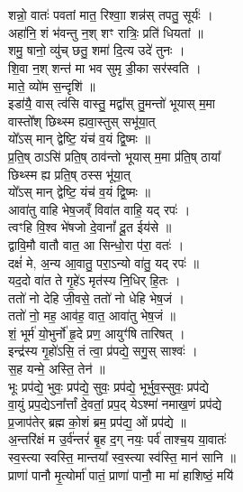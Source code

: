 \section{}
शन्नो॒ वातः॑ पवतां मात॒ रिश्वाा॒ शन्न॑स् तपतु॒ सूर्यः॑ । \\
अहा॑नि॒ शं भ॑वन्तु न॒श् शꣳ रात्रिः॒ प्रति॑ धियतां ॥\\
शमु॒ षानो॒ व्यु॑च् छतु॒ शमा॑ दि॒त्य उदे॑ तुनः । \\
शि॒वा न॒श् शन्त॑ मा भव सुमृ डी॒का सर॑स्वति ।\\
माते॒ व्यो॑म स॒न्दृशि॑ ॥\\
इडा॑यै॒ वास् त्व॑सि वास्तु॒ मद्वा᳚स् तु॒मन्तो॑ भूयास् म॒मा \\
वास्तो᳚श् छिथ्स्म ह्यवा॒स्तुस् सभू॑या॒त्\\
यो᳚ऽस् मान् द्वेष्टि॒ यंच॑ व॒यं द्वि॒ष्मः ॥\\
प्र॒ति॒ष् ठाऽसि॑ प्रति॒ष् ठाव॑न्तो भूयास् म॒मा प्र॑ति॒ष् ठाया᳚\\
छिथ्स्म ह्य प्रति॒ष् ठस्स भू॑या॒त् \\
यो᳚ऽस् मान् द्वेष्टि॒ यंच॑ व॒यं द्वि॒ष्मः ॥\\
आवा॑तु वाहि भेष॒जव्ँ विवा॑त वाहि॒ यद् रपः॑ ।\\
त्वꣳहि वि॒श्व भे॑षजो दे॒वानां᳚ दू॒त ईय॑से ॥\\
द्वावि॒मौ वातौ वात॒ आ सिन्धो॒रा प॑रा॒ वतः॑ । \\
दक्षं॑ मे, अ॒न्य आ॒वातु॒ परा॒ऽन्यो वा॑तु॒ यद् रपः॑ ॥\\
यद॒दो वा॑त ते गृ॒हे॑ऽ मृत॑स्य नि॒धिर् हि॒तः । \\
ततो॑ नो देहि जी॒वसे॒ ततो॑ नो धेहि भेष॒जं ।\\
ततो॑ नो॒ मह॒ आव॑ह॒ वात॒ आवा॑तु भेष॒जं ॥\\
शं॒ भूर्म॑ यो॒भुर्नो॑ हृ॒दे प्रण॒ आयुꣳ॑षि तारिषत् । \\
इन्द्र॑स्य गृ॒हो॑ऽसि॒ तं त्वा॒ प्र॑पद्ये॒ सगु॒स् साश्वः॑ ।\\
स॒ह यन्मे॒ अस्ति॒ तेन॑ ॥\\
भूः प्रप॑द्ये॒ भुवः॒ प्रप॑द्ये॒ सुवः॒ प्रप॑द्ये॒ भूर्भुव॒स्सुवः॒ प्रप॑द्ये\\
वा॒युं प्रप॒द्येऽना᳚र्त्तां दे॒वतां॒ प्रप॒द् येऽश्मा॑ नमाख॒णं प्रप॑द्ये \\
प्र॒जाप॑तेर् ब्रह्म को॒शं ब्रम॒ प्रप॑द्य॒ ओं प्रप॑द्ये ॥\\
अ॒न्तरि॑क्षं म उ॒र्व॑न्तरं॑ बृ॒ह द॒ग् नयः॒ पर्व॑ ताश्च॒य या॒वातः॑ \\
स्व॒स्त्या स्वस्ति॒ मान्तया᳚ स्व॒स्त्या स्व॑स्ति॒ मान॑ सानि ॥\\
प्राणा॑ पानौ मृ॒त्योर्मा॑ पातं॒ प्राणा॑ पानौ॒ मा मा॑ हाशिष्ठं॒ मयि॑ \\
